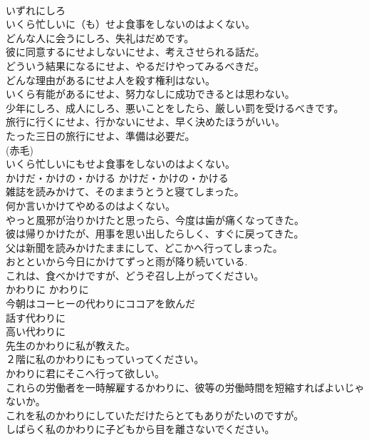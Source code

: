 \documentclass[8pt]{extreport}
\begin{document}
\begin{CJK}{UTF8}{min}
\\	いずれにしろ  
\\	いくら忙しいに（も）せよ食事をしないのはよくない。  
\\	どんな人に会うにしろ、失礼はだめです。  
\\	彼に同意するにせよしないにせよ、考えさせられる話だ。   
\\	どういう結果になるにせよ、やるだけやってみるべきだ。   
\\	どんな理由があるにせよ人を殺す権利はない。  
\\	いくら有能があるにせよ、努力なしに成功できるとは思わない。  
\\	少年にしろ、成人にしろ、悪いことをしたら、厳しい罰を受けるべきです。   
\\	旅行に行くにせよ、行かないにせよ、早く決めたほうがいい。  
\\	たった三日の旅行にせよ、準備は必要だ。  
\\	(赤毛)
\\	いくら忙しいにもせよ食事をしないのはよくない。  
\\	かけだ・かけの・かける	かけだ・かけの・かける	
\\	雑誌を読みかけて、そのままうとうと寝てしまった。  
\\	何か言いかけてやめるのはよくない。  
\\	やっと風邪が治りかけたと思ったら、今度は歯が痛くなってきた。   
\\	彼は帰りかけたが、用事を思い出したらしく、すぐに戻ってきた。 
\\	父は新聞を読みかけたままにして、どこかへ行ってしまった。 
\\	おとといから今日にかけてずっと雨が降り続いている. 
\\	これは、食べかけですが、どうぞ召し上がってください。
\\	かわりに	かわりに	
\\	今朝はコーヒーの代わりにココアを飲んだ  
\\	話す代わりに  
\\	高い代わりに  
\\	先生のかわりに私が教えた。  
\\	２階に私のかわりにもっていってください。   
\\	かわりに君にそこへ行って欲しい。   
\\	これらの労働者を一時解雇するかわりに、彼等の労働時間を短縮すればよいじゃないか。   
\\	これを私のかわりにしていただけたらとてもありがたいのですが。   
\\	しばらく私のかわりに子どもから目を離さないでください。   

\end{CJK}
\end{document}
